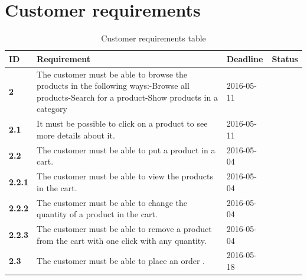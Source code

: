 \documentclass[a4paper,12pt]{article}
\begin{document}
\section{Customer requirements}
\begin{table}[htbp]
	\centering
	\caption{Customer requirements table}
	\label{my-label}
	\begin{tabular}{|l|L{8cm}|L{2.5cm}|L{2.5cm}|}
		\hline
		\textbf{ID}    & \textbf{Requirement}                                                                                                                                                                          & Deadline & Status \\ \hline
		\textbf{2}     & The customer must be able to browse the products in the following ways:\newline -Browse all products\newline -Search for a product\newline -Show products in a category &  2016-05-11       &        \\ \hline
		\textbf{2.1}   & It must be possible to click on a product to see more details about it.                                                                                                                       &     2016-05-11       &        \\ \hline
		\textbf{2.2}   & The customer must be able to put a product in a cart.                                                                                                                                         &   2016-05-04      &        \\ \hline
		\textbf{2.2.1} & The customer must be able to view the products in the cart.                                                                                                                                   &    2016-05-04    &        \\ \hline
		\textbf{2.2.2} & The customer must be able to change the quantity of a product in the cart.                                                                                                              &   2016-05-04       &        \\ \hline
		\textbf{2.2.3} & The customer must be able to remove a product from the cart with one click with any quantity.                                                     &     2016-05-04     &        \\ \hline
		\textbf{2.3}   & The customer must be able to place an order   .                                                                                                                                               &    2016-05-18     &        \\ \hline

\end{tabular}
\end{table}
\end{document}
